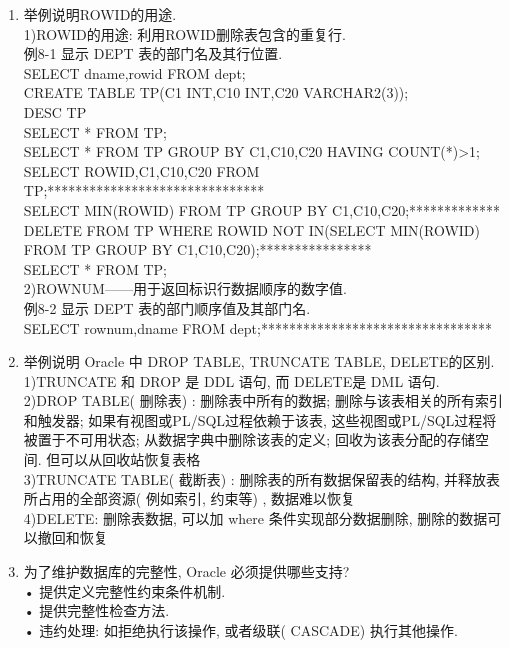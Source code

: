 \documentclass{article}                     %
\numberwithin{equation}{section}            %
\numberwithin{figure}{section}              %
\numberwithin{table}{section}               %
\begin{document}
\begin{enumerate}
\item 举例说明ROWID的用途. \\
1)ROWID的用途: 利用ROWID删除表包含的重复行. \\
例8-1  显示 DEPT 表的部门名及其行位置.  \\
SELECT dname,rowid FROM dept;\\
CREATE TABLE TP(C1 INT,C10 INT,C20 VARCHAR2(3));\\
DESC TP\\
SELECT * FROM TP;\\
SELECT * FROM TP GROUP BY C1,C10,C20 HAVING COUNT(*)>1;\\
SELECT ROWID,C1,C10,C20 FROM TP;*******************************\\
SELECT MIN(ROWID) FROM TP GROUP BY C1,C10,C20;*************\\
DELETE FROM TP WHERE ROWID NOT IN(SELECT MIN(ROWID) FROM TP GROUP BY C1,C10,C20);****************\\
SELECT * FROM TP;\\
2)ROWNUM——用于返回标识行数据顺序的数字值. \\
例8-2 显示 DEPT 表的部门顺序值及其部门名. \\
SELECT rownum,dname FROM dept;*********************************\\




\item 举例说明 Oracle 中 DROP TABLE, TRUNCATE TABLE, DELETE的区别. \\
1)TRUNCATE 和 DROP 是 DDL 语句, 而 DELETE是 DML 语句. \\
2)DROP TABLE( 删除表) : 删除表中所有的数据; 删除与该表相关的所有索引和触发器; 如果有视图或PL/SQL过程依赖于该表, 这些视图或PL/SQL过程将被置于不可用状态; 从数据字典中删除该表的定义; 回收为该表分配的存储空间. 但可以从回收站恢复表格\\
3)TRUNCATE TABLE( 截断表) : 删除表的所有数据保留表的结构, 并释放表所占用的全部资源( 例如索引, 约束等) , 数据难以恢复\\
4)DELETE: 删除表数据, 可以加 where 条件实现部分数据删除, 删除的数据可以撤回和恢复\\

\item 为了维护数据库的完整性, Oracle 必须提供哪些支持? \\
• 提供定义完整性约束条件机制. \\
• 提供完整性检查方法. \\
• 违约处理: 如拒绝执行该操作, 或者级联( CASCADE) 执行其他操作. \\






\end{enumerate}
\end{document}
